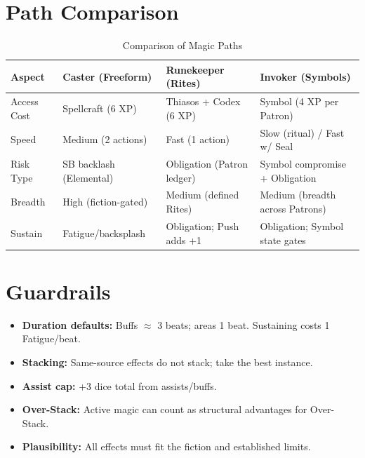 \section{Path Comparison}\label{sec:path_comparison}

\begin{longtable}{p{3.5cm}p{4cm}p{4cm}p{4cm}}
\caption{Comparison of Magic Paths}\label{tab:path_comparison}\\
\toprule
\textbf{Aspect} & \textbf{Caster (Freeform)} & \textbf{Runekeeper (Rites)} & \textbf{Invoker (Symbols)} \\
\midrule
Access Cost & Spellcraft (6 XP) & Thiasos + Codex (6 XP) & Symbol (4 XP per Patron) \\
Speed & Medium (2 actions) & Fast (1 action) & Slow (ritual) / Fast w/ Seal \\
Risk Type & SB backlash (Elemental) & Obligation (Patron ledger) & Symbol compromise + Obligation \\
Breadth & High (fiction-gated) & Medium (defined Rites) & Medium (breadth across Patrons) \\
Sustain & Fatigue/backsplash & Obligation; Push adds +1 & Obligation; Symbol state gates \\
\bottomrule
\end{longtable}

\section*{Guardrails}\label{sec:magic_guardrails}
\begin{itemize}
    \item \textbf{Duration defaults:} Buffs $\approx$ 3 beats; areas 1 beat. Sustaining costs 1 Fatigue/beat.
    \item \textbf{Stacking:} Same-source effects do not stack; take the best instance.
    \item \textbf{Assist cap:} +3 dice total from assists/buffs.
    \item \textbf{Over-Stack:} Active magic can count as structural advantages for Over-Stack.
    \item \textbf{Plausibility:} All effects must fit the fiction and established limits.
\end{itemize}



